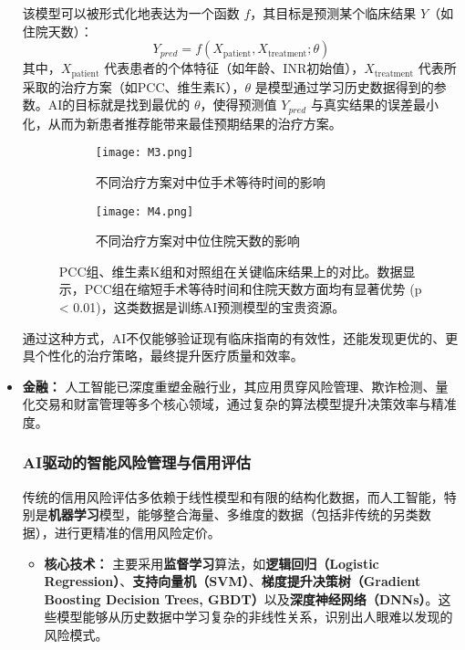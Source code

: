 \begin{itemize}
    该模型可以被形式化地表达为一个函数 $f$，其目标是预测某个临床结果 $Y$（如住院天数）：
    $$
    Y_{pred} = f(X_{\text{patient}}, X_{\text{treatment}}; \theta)
    $$
    其中，$X_{\text{patient}}$ 代表患者的个体特征（如年龄、INR初始值），$X_{\text{treatment}}$ 代表所采取的治疗方案（如PCC、维生素K），$\theta$ 是模型通过学习历史数据得到的参数。AI的目标就是找到最优的 $\theta$，使得预测值 $Y_{pred}$ 与真实结果的误差最小化，从而为新患者推荐能带来最佳预期结果的治疗方案。

    \begin{figure}[htbp]
        \centering
        \begin{subfigure}[b]{0.48\textwidth}
            \centering
            \texttt{[image: M3.png]}
            \caption{不同治疗方案对中位手术等待时间的影响}
            \label{fig:time_to_surgery_comparison}
        \end{subfigure}
        \hfill
        \begin{subfigure}[b]{0.48\textwidth}
            \centering
            \texttt{[image: M4.png]}
            \caption{不同治疗方案对中位住院天数的影响}
            \label{fig:length_of_stay_comparison}
        \end{subfigure}
        \caption{PCC组、维生素K组和对照组在关键临床结果上的对比。数据显示，PCC组在缩短手术等待时间和住院天数方面均有显著优势 (p < 0.01)，这类数据是训练AI预测模型的宝贵资源。}
        \label{fig:treatment_outcome_comparison}
    \end{figure}

    通过这种方式，AI不仅能够验证现有临床指南的有效性，还能发现更优的、更具个性化的治疗策略，最终提升医疗质量和效率。
    
    \item \textbf{金融：} 人工智能已深度重塑金融行业，其应用贯穿风险管理、欺诈检测、量化交易和财富管理等多个核心领域，通过复杂的算法模型提升决策效率与精准度。

    \subsubsection{AI驱动的智能风险管理与信用评估}
    传统的信用风险评估多依赖于线性模型和有限的结构化数据，而人工智能，特别是\textbf{机器学习}模型，能够整合海量、多维度的数据（包括非传统的另类数据），进行更精准的信用风险定价。
    \begin{itemize}
        \item \textbf{核心技术：} 主要采用\textbf{监督学习}算法，如\textbf{逻辑回归（Logistic Regression）}、\textbf{支持向量机（SVM）}、\textbf{梯度提升决策树（Gradient Boosting Decision Trees, GBDT）}以及\textbf{深度神经网络（DNNs）}。这些模型能够从历史数据中学习复杂的非线性关系，识别出人眼难以发现的风险模式。


\end{itemize}
\end{itemize}
